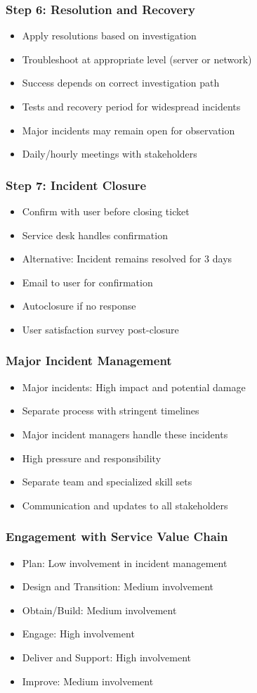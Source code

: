\documentclass[aspectratio=169, table]{beamer}
\begin{document}
\begin{frame}
	\frametitle{Step 6: Resolution and Recovery}
	\begin{itemize}
		\item Apply resolutions based on investigation
		\item Troubleshoot at appropriate level (server or network)
		\item Success depends on correct investigation path
		\item Tests and recovery period for widespread incidents
		\item Major incidents may remain open for observation
		\item Daily/hourly meetings with stakeholders
	\end{itemize}
\end{frame}

\begin{frame}
	\frametitle{Step 7: Incident Closure}
	\begin{itemize}
		\item Confirm with user before closing ticket
		\item Service desk handles confirmation
		\item Alternative: Incident remains resolved for 3 days
		\item Email to user for confirmation
		\item Autoclosure if no response
		\item User satisfaction survey post-closure
	\end{itemize}
\end{frame}

\begin{frame}
	\frametitle{Major Incident Management}
	\begin{itemize}
		\item Major incidents: High impact and potential damage
		\item Separate process with stringent timelines
		\item Major incident managers handle these incidents
		\item High pressure and responsibility
		\item Separate team and specialized skill sets
		\item Communication and updates to all stakeholders
	\end{itemize}
\end{frame}

\begin{frame}
	\frametitle{Engagement with Service Value Chain}
	\begin{itemize}
		\item Plan: Low involvement in incident management
		\item Design and Transition: Medium involvement
		\item Obtain/Build: Medium involvement
		\item Engage: High involvement
		\item Deliver and Support: High involvement
		\item Improve: Medium involvement
	\end{itemize}
\end{frame}
\end{document}
